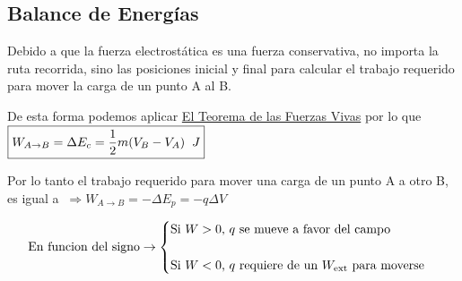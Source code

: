 \subsection{Balance de Energías}
\begin{wrapfigure}{r}{5cm}
\end{wrapfigure}
Debido a que la fuerza electrostática es una fuerza conservativa, no importa la ruta recorrida, sino las posiciones inicial y final para calcular el trabajo requerido para mover la carga de un punto A al B.\par
\vspace{0.5cm}
\hspace{-.725cm}
De esta forma podemos aplicar \underline{El Teorema de las Fuerzas Vivas} por lo que \(\boxed{W_{A \to B} = \Delta E_c = \frac{1}{2} m (V_B -V_A) \hspace{2mm}J}\)
\par
\vspace{0.5cm}
\hspace{-.6cm}
Por lo tanto el trabajo requerido para mover una carga de un punto A a otro B, es igual a \(\ \Rightarrow \boxed{W_{A \to B} =-\Delta E_p = -q \Delta V}\) \par
\vspace{0.5cm}
\[
        \textnormal{En funcion del signo} \rightarrow
        \begin{cases}
                \textnormal{Si \(W > 0\), \(q\) se mueve a favor del campo} \\
                \\
                \textnormal{Si \(W < 0\), \(q\) requiere de un \(W_{\textnormal{ext}}\) para moverse}
        \end{cases}
\]